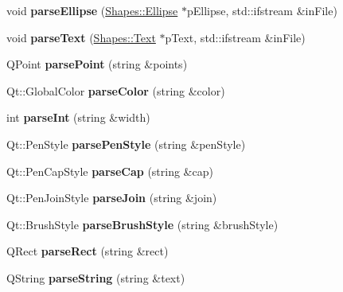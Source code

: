 \begin{DoxyCompactItemize}
void {\bfseries parse\+Ellipse} (\mbox{\hyperlink{class_shapes_1_1_ellipse}{Shapes\+::\+Ellipse}} $\ast$p\+Ellipse, std\+::ifstream \&in\+File)
\item 
\mbox{\label{class_shapes_parser_a3f7676037861b07c216431e2ab8aefba}} 
void {\bfseries parse\+Text} (\mbox{\hyperlink{class_shapes_1_1_text}{Shapes\+::\+Text}} $\ast$p\+Text, std\+::ifstream \&in\+File)
\item 
\mbox{\label{class_shapes_parser_a39817b684c72029331ddaa825897bed5}} 
Q\+Point {\bfseries parse\+Point} (string \&points)
\item 
\mbox{\label{class_shapes_parser_af7d198702c437f636834f6cc17e7a26a}} 
Qt\+::\+Global\+Color {\bfseries parse\+Color} (string \&color)
\item 
\mbox{\label{class_shapes_parser_ac71ae59c3922ff3ace1a51ba0b7a2dc9}} 
int {\bfseries parse\+Int} (string \&width)
\item 
\mbox{\label{class_shapes_parser_ad7febc62825c856a66a110ea7f043fc7}} 
Qt\+::\+Pen\+Style {\bfseries parse\+Pen\+Style} (string \&pen\+Style)
\item 
\mbox{\label{class_shapes_parser_a365005dcaa449e51c374785f8ef1e6c6}} 
Qt\+::\+Pen\+Cap\+Style {\bfseries parse\+Cap} (string \&cap)
\item 
\mbox{\label{class_shapes_parser_ad0a440f842537f99f396076dc14c5287}} 
Qt\+::\+Pen\+Join\+Style {\bfseries parse\+Join} (string \&join)
\item 
\mbox{\label{class_shapes_parser_a9dc09a42ec1d62c88a212aa97d4533d8}} 
Qt\+::\+Brush\+Style {\bfseries parse\+Brush\+Style} (string \&brush\+Style)
\item 
\mbox{\label{class_shapes_parser_ae36d2dd274222fcbe7d071c4c26e2e80}} 
Q\+Rect {\bfseries parse\+Rect} (string \&rect)
\item 
\mbox{\label{class_shapes_parser_ad5cd21df924d00b4fd9c96f352e0ad37}} 
Q\+String {\bfseries parse\+String} (string \&text)

\end{DoxyCompactItemize}
